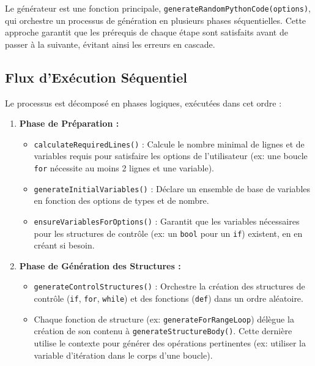 \documentclass[a4paper, 11pt]{article}
\begin{document}
Le générateur est une fonction principale, \texttt{generateRandomPythonCode(options)}, qui orchestre un processus de génération en plusieurs phases séquentielles. Cette approche garantit que les prérequis de chaque étape sont satisfaits avant de passer à la suivante, évitant ainsi les erreurs en cascade.

\subsection{Flux d'Exécution Séquentiel}
Le processus est décomposé en phases logiques, exécutées dans cet ordre :

\begin{enumerate}[label=\arabic*.]
    \item \textbf{Phase de Préparation :}
    \begin{itemize}
        \item \texttt{calculateRequiredLines()} : Calcule le nombre minimal de lignes et de variables requis pour satisfaire les options de l'utilisateur (ex: une boucle \texttt{for} nécessite au moins 2 lignes et une variable).
        \item \texttt{generateInitialVariables()} : Déclare un ensemble de base de variables en fonction des options de types et de nombre.
        \item \texttt{ensureVariablesForOptions()} : Garantit que les variables nécessaires pour les structures de contrôle (ex: un \texttt{bool} pour un \texttt{if}) existent, en en créant si besoin.
    \end{itemize}

    \item \textbf{Phase de Génération des Structures :}
    \begin{itemize}
        \item \texttt{generateControlStructures()} : Orchestre la création des structures de contrôle (\texttt{if}, \texttt{for}, \texttt{while}) et des fonctions (\texttt{def}) dans un ordre aléatoire.
        \item Chaque fonction de structure (ex: \texttt{generateForRangeLoop}) délègue la création de son contenu à \texttt{generateStructureBody()}. Cette dernière utilise le contexte pour générer des opérations pertinentes (ex: utiliser la variable d'itération dans le corps d'une boucle).
    \end{itemize}


\end{enumerate}
\end{document}

